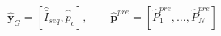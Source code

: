 $\hat{\mathbf{y}}_G=[\widehat{\bar{I}}_{seq}, \widehat{\bar{p}}_c], \qquad
\hat{\mathbf{p}}^{pre}=[\hat{P}^{pre}_1, \ldots, \hat{P}^{pre}_N]$
